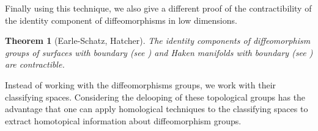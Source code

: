 \documentclass[a4paper]{amsart}
\newtheorem{thm}{Theorem}[section]
\theoremstyle{definition}
\theoremstyle{remark}
\newcommand\Diff{\mathrm{Diff}}
\numberwithin{equation}{section}
\begin{document}
Finally using this technique, we also give a different proof of the contractibility of the identity component of diffeomorphisms in low dimensions. %
\begin{thm}[Earle-Schatz, Hatcher] The identity components of diffeomorphism groups of surfaces with boundary (see \cite{MR0277000}) and Haken manifolds with boundary (see \cite{MR0420620}) are contractible.
\end{thm}
Instead of working with the diffeomorphisms groups, we work with their classifying spaces. Considering the delooping of these topological groups has the advantage that one can apply homological techniques to the classifying spaces to extract homotopical information about diffeomorphism groups. 
\end{document}
